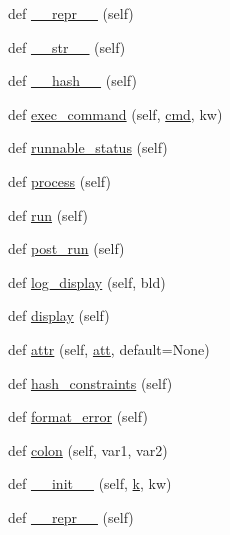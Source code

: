 \begin{DoxyCompactItemize}
def \hyperlink{classwaflib_1_1_task_1_1_task_base_a004a67fbb5d7e36d1a6ba48390e0d5f7}{\+\_\+\+\_\+repr\+\_\+\+\_\+} (self)
\item 
def \hyperlink{classwaflib_1_1_task_1_1_task_base_a07123f80c95b1d17a699064cd10d8885}{\+\_\+\+\_\+str\+\_\+\+\_\+} (self)
\item 
def \hyperlink{classwaflib_1_1_task_1_1_task_base_a5e02f89716bcd37b2490adc0861c4bdd}{\+\_\+\+\_\+hash\+\_\+\+\_\+} (self)
\item 
def \hyperlink{classwaflib_1_1_task_1_1_task_base_a6326ff82d67a2b629c8d78b95cb8fec6}{exec\+\_\+command} (self, \hyperlink{sndfile__play_8m_adfc5ba7e22f5e4a6221c12a70503bef3}{cmd}, kw)
\item 
def \hyperlink{classwaflib_1_1_task_1_1_task_base_a10c4597d9085bd1680f9b3eb28e23899}{runnable\+\_\+status} (self)
\item 
def \hyperlink{classwaflib_1_1_task_1_1_task_base_ae5e951a187c8d09c31960bbcf76fad25}{process} (self)
\item 
def \hyperlink{classwaflib_1_1_task_1_1_task_base_ae549bc1a80fd94cc94fd1e764c76895c}{run} (self)
\item 
def \hyperlink{classwaflib_1_1_task_1_1_task_base_a21b09d3f18df76e1d8b0719f321ea3bd}{post\+\_\+run} (self)
\item 
def \hyperlink{classwaflib_1_1_task_1_1_task_base_adf380fd031fc987f4dcd54e1f70420a7}{log\+\_\+display} (self, bld)
\item 
def \hyperlink{classwaflib_1_1_task_1_1_task_base_a838316cf55ac50fab2ae0e8771917e74}{display} (self)
\item 
def \hyperlink{classwaflib_1_1_task_1_1_task_base_a8ead2ec09545f4e9e27d6b40f9f80eaa}{attr} (self, \hyperlink{filters_8h_a6cbe32dd86cefd1a8b182b3ee652e9bf}{att}, default=None)
\item 
def \hyperlink{classwaflib_1_1_task_1_1_task_base_ad4f2583a59ff62565735490154826033}{hash\+\_\+constraints} (self)
\item 
def \hyperlink{classwaflib_1_1_task_1_1_task_base_a321e667402035aa56626ee6f7b3b8223}{format\+\_\+error} (self)
\item 
def \hyperlink{classwaflib_1_1_task_1_1_task_base_ae9648ec691e059291a79f38ef6ee12cc}{colon} (self, var1, var2)
\item 
def \hyperlink{classwaflib_1_1_task_1_1_task_base_add6ae927b00bd1f14d5b87738dd53e70}{\+\_\+\+\_\+init\+\_\+\+\_\+} (self, \hyperlink{rfft2d_test_m_l_8m_adc468c70fb574ebd07287b38d0d0676d}{k}, kw)
\item 
def \hyperlink{classwaflib_1_1_task_1_1_task_base_a004a67fbb5d7e36d1a6ba48390e0d5f7}{\+\_\+\+\_\+repr\+\_\+\+\_\+} (self)

\end{DoxyCompactItemize}
